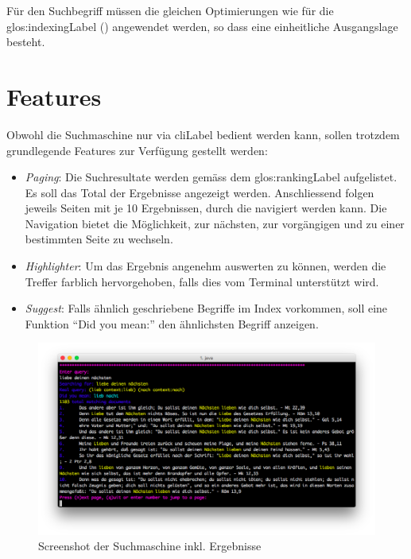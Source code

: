 Für den Suchbegriff müssen die gleichen Optimierungen wie für die \gls{glos:indexingLabel} () angewendet werden, so dass eine einheitliche Ausgangslage besteht.

\section{Features}
Obwohl die Suchmaschine nur via \gls{cliLabel} bedient werden kann, sollen trotzdem grundlegende Features zur Verfügung gestellt werden:
\begin{itemize}[noitemsep]
	\item \textit{Paging}:
	Die Suchresultate werden gemäss dem \gls{glos:rankingLabel} aufgelistet. Es soll das Total der Ergebnisse angezeigt werden. Anschliessend folgen jeweils Seiten mit je 10 Ergebnissen, durch die navigiert werden kann.
	Die Navigation bietet die Möglichkeit, zur nächsten, zur vorgängigen und zu einer bestimmten Seite zu wechseln.
	
	\item \textit{Highlighter}:
	Um das Ergebnis angenehm auswerten zu können, werden die Treffer farblich hervorgehoben, falls dies vom Terminal unterstützt wird.

	\item \textit{Suggest}:
	Falls ähnlich geschriebene Begriffe im Index vorkommen, soll eine Funktion "`Did you mean:"' den ähnlichsten Begriff anzeigen.
	
\end{itemize}

\vfill
\begin{figure}[H]
	\centering
	\includegraphics[width=1.0\textwidth]{images/3-realization/searching_screenshot.png}
	\caption{Screenshot der Suchmaschine inkl. Ergebnisse}
\end{figure}

